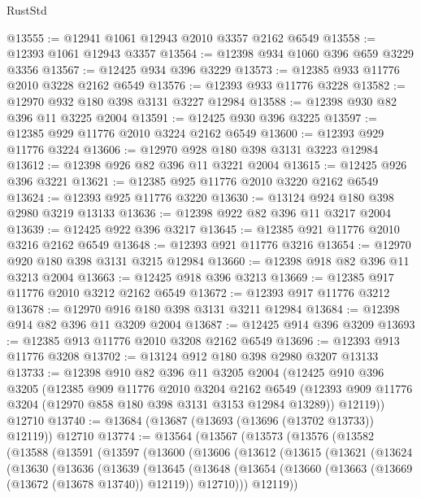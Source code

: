 \begin{lexlean}{RustStd}
\begin{coremodule}
@13555 := @12941 @1061 @12943 @2010 @3357 @2162 @6549
@13558 := @12393 @1061 @12943 @3357
@13564 := @12398 @934 @1060 @396 @659 @3229 @3356
@13567 := @12425 @934 @396 @3229
@13573 := @12385 @933 @11776 @2010 @3228 @2162 @6549
@13576 := @12393 @933 @11776 @3228
@13582 := @12970 @932 @180 @398 @3131 @3227 @12984
@13588 := @12398 @930 @82 @396 @11 @3225 @2004
@13591 := @12425 @930 @396 @3225
@13597 := @12385 @929 @11776 @2010 @3224 @2162 @6549
@13600 := @12393 @929 @11776 @3224
@13606 := @12970 @928 @180 @398 @3131 @3223 @12984
@13612 := @12398 @926 @82 @396 @11 @3221 @2004
@13615 := @12425 @926 @396 @3221
@13621 := @12385 @925 @11776 @2010 @3220 @2162 @6549
@13624 := @12393 @925 @11776 @3220
@13630 := @13124 @924 @180 @398 @2980 @3219 @13133
@13636 := @12398 @922 @82 @396 @11 @3217 @2004
@13639 := @12425 @922 @396 @3217
@13645 := @12385 @921 @11776 @2010 @3216 @2162 @6549
@13648 := @12393 @921 @11776 @3216
@13654 := @12970 @920 @180 @398 @3131 @3215 @12984
@13660 := @12398 @918 @82 @396 @11 @3213 @2004
@13663 := @12425 @918 @396 @3213
@13669 := @12385 @917 @11776 @2010 @3212 @2162 @6549
@13672 := @12393 @917 @11776 @3212
@13678 := @12970 @916 @180 @398 @3131 @3211 @12984
@13684 := @12398 @914 @82 @396 @11 @3209 @2004
@13687 := @12425 @914 @396 @3209
@13693 := @12385 @913 @11776 @2010 @3208 @2162 @6549
@13696 := @12393 @913 @11776 @3208
@13702 := @13124 @912 @180 @398 @2980 @3207 @13133
@13733 := @12398
    @910
    @82
    @396
    @11
    @3205
    @2004
    (@12425
      @910
      @396
      @3205
      (@12385
        @909
        @11776
        @2010
        @3204
        @2162
        @6549
        (@12393 @909 @11776 @3204 (@12970 @858 @180 @398 @3131 @3153 @12984 @13289))
        @12119))
    @12710
@13740 := @13684 (@13687 (@13693 (@13696 (@13702 @13733)) @12119)) @12710
@13774 := @13564
    (@13567
      (@13573
        (@13576
          (@13582
            (@13588
              (@13591
                (@13597
                  (@13600
                    (@13606
                      (@13612
                        (@13615
                          (@13621
                            (@13624
                              (@13630
                                (@13636
                                  (@13639
                                    (@13645
                                      (@13648
                                        (@13654
                                          (@13660
                                            (@13663 (@13669 (@13672 (@13678 @13740)) @12119))
                                            @12710)))
                                      @12119))

\end{coremodule}
\end{lexlean}
